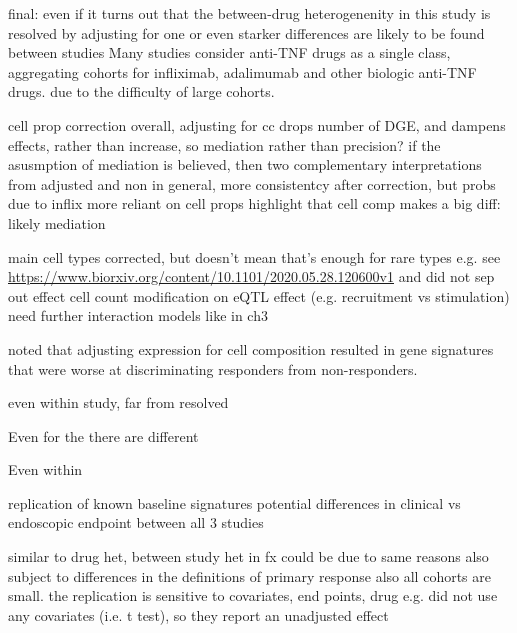 \begin{outline}
    final: even if it turns out that the between-drug heterogenenity in this study is resolved by adjusting for one or
    even starker differences are likely to be found between studies
    Many studies consider anti-\gls{TNF} drugs as a single class, aggregating cohorts for infliximab, adalimumab and other biologic anti-\gls{TNF} drugs.
    due to the difficulty of large cohorts.


    \2 cell prop correction
        \3 overall, adjusting for cc drops number of DGE, and dampens effects, rather than increase, so mediation rather than precision?
        \3 if the asusmption of mediation is believed, then two complementary interpretations from adjusted and non
        \3 in general, more consistentcy after correction, but probs due to inflix more reliant on cell props
        \3 highlight that cell comp makes a big diff: likely mediation

     main cell types corrected, but doesn't mean that's enough for rare types e.g. see \url{https://www.biorxiv.org/content/10.1101/2020.05.28.120600v1} 
        \3 and did not sep out effect cell count modification on eQTL effect (e.g. recruitment vs stimulation)
        \3 need further interaction models like in ch3

\textcite{gaujoux2019CellcentredMetaanalysisReveals} noted that adjusting expression for cell composition resulted in gene signatures that were worse at discriminating responders from non-responders.

    even within study, far from resolved

Even for the 
there are different 

Even within  

\1 replication of known baseline signatures
    \2 potential differences in clinical vs endoscopic endpoint between all 3 studies

similar to drug het, between study het in fx could be due to same reasons
also subject to differences in the definitions of primary response
also all cohorts are small.
    \2 the replication is sensitive to covariates, end points, drug
        \3 e.g. \textcite{verstockt2019LowTREM1Expression} did not use any covariates (i.e. t test), so they report an unadjusted effect


\end{outline}
